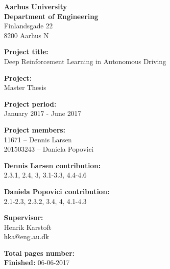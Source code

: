 \begin{minipage}[t]{1\textwidth}

{\small 
\flushleft
\textbf{Aarhus University}\\
\textbf{Department of Engineering}  \\
Finlandsgade 22 \\
8200 Aarhus N \\
}

\vspace*{1cm}

\textbf{Project title:} \\[5pt]\bigskip\hspace{2ex}
Deep Reinforcement Learning in Autonomous Driving

\textbf{Project:} \\[5pt]\bigskip\hspace{2ex}
Master Thesis

\textbf{Project period:} \\[5pt]\bigskip\hspace{2ex}
January 2017 - June 2017

\textbf{Project members:} \\[5pt]\hspace*{2ex}
11671 	  -- Dennis Larsen \\\hspace*{2ex}
201503243 -- Daniela Popovici \\\hspace*{2ex}

\textbf{Dennis Larsen contribution:} \\[5pt]\hspace*{2ex}
2.3.1, 2.4, 3, 3.1-3.3, 4.4-4.6 \\\hspace*{2ex}

\textbf{Daniela Popovici contribution:} \\[5pt]\hspace*{2ex}
2.1-2.3, 2.3.2, 3.4, 4, 4.1-4.3 \\\hspace*{2ex}

\textbf{Supervisor:} \\[5pt]\hspace*{2ex}
Henrik Karstoft \\\hspace*{2ex}
hka@eng.au.dk \\\hspace*{2ex}

\textbf{Total pages number:} \pageref{LastPage} \\
\textbf{Finished:} 06-06-2017
\end{minipage}
\hfill
\vfill